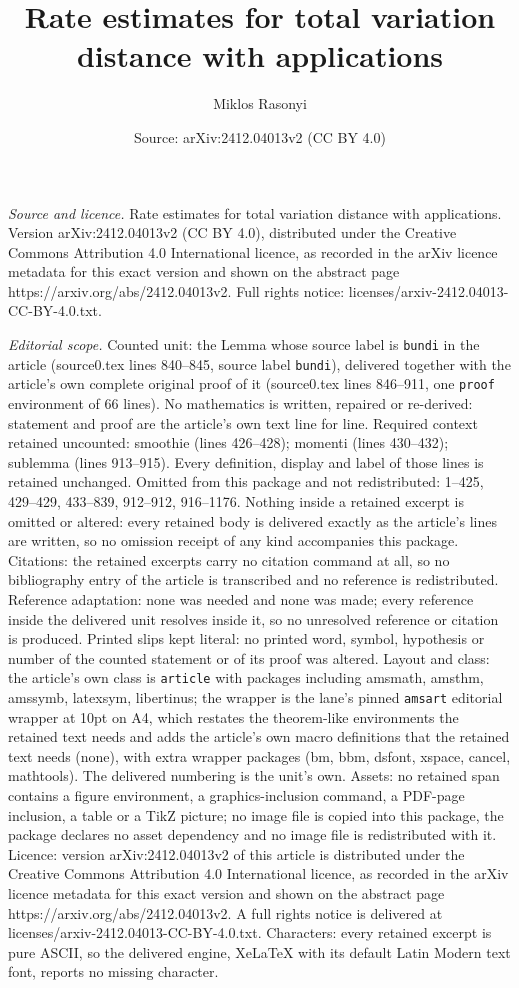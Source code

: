 \documentclass[10pt,a4paper]{amsart}
\title[Rate estimates for total variation distance with application]{Rate estimates for total variation distance with applications}
\author{Miklos Rasonyi}
\date{Source: arXiv:2412.04013v2 (CC BY 4.0)}
\begin{document}
\maketitle

\noindent\emph{Source and licence.} Rate estimates for total variation distance with applications. Version arXiv:2412.04013v2 (CC BY 4.0), distributed under the Creative Commons Attribution 4.0 International licence, as recorded in the arXiv licence metadata for this exact version and shown on the abstract page https://arxiv.org/abs/2412.04013v2. Full rights notice: licenses/arxiv-2412.04013-CC-BY-4.0.txt.\par\smallskip

\noindent\textit{Editorial scope.} Counted unit: the Lemma whose source label is \texttt{bundi} in the article (source0.tex lines 840--845, source label \texttt{bundi}), delivered together with the article's own complete original proof of it (source0.tex lines 846--911, one \texttt{proof} environment of 66 lines). No mathematics is written, repaired or re-derived: statement and proof are the article's own text line for line. Required context retained uncounted: smoothie (lines 426--428); momenti (lines 430--432); sublemma (lines 913--915). Every definition, display and label of those lines is retained unchanged. Omitted from this package and not redistributed: 1--425, 429--429, 433--839, 912--912, 916--1176. Nothing inside a retained excerpt is omitted or altered: every retained body is delivered exactly as the article's lines are written, so no omission receipt of any kind accompanies this package. Citations: the retained excerpts carry no citation command at all, so no bibliography entry of the article is transcribed and no reference is redistributed. Reference adaptation: none was needed and none was made; every reference inside the delivered unit resolves inside it, so no unresolved reference or citation is produced. Printed slips kept literal: no printed word, symbol, hypothesis or number of the counted statement or of its proof was altered. Layout and class: the article's own class is \texttt{article} with packages including amsmath, amsthm, amssymb, latexsym, libertinus; the wrapper is the lane's pinned \texttt{amsart} editorial wrapper at 10pt on A4, which restates the theorem-like environments the retained text needs and adds the article's own macro definitions that the retained text needs (none), with extra wrapper packages (bm, bbm, dsfont, xspace, cancel, mathtools). The delivered numbering is the unit's own. Assets: no retained span contains a figure environment, a graphics-inclusion command, a PDF-page inclusion, a table or a TikZ picture; no image file is copied into this package, the package declares no asset dependency and no image file is redistributed with it. Licence: version arXiv:2412.04013v2 of this article is distributed under the Creative Commons Attribution 4.0 International licence, as recorded in the arXiv licence metadata for this exact version and shown on the abstract page https://arxiv.org/abs/2412.04013v2. A full rights notice is delivered at licenses/arxiv-2412.04013-CC-BY-4.0.txt. Characters: every retained excerpt is pure ASCII, so the delivered engine, XeLaTeX with its default Latin Modern text font, reports no missing character.
\end{document}
